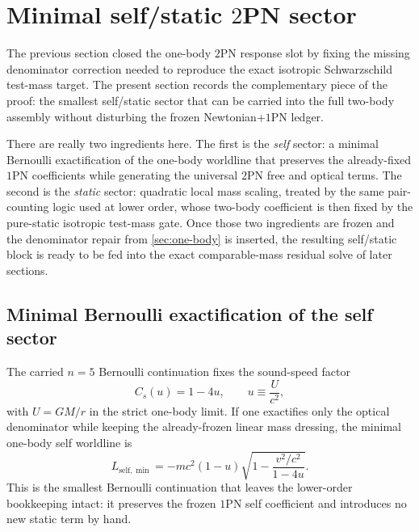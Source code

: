 \documentclass[11pt]{article}
\newcommand{\OnePN}{\mathrm{1PN}}
\newcommand{\TwoPN}{\mathrm{2PN}}
\begin{document}
\section{Minimal self/static \texorpdfstring{$2$}{2}PN sector}
\label{sec:self-static}

The previous section closed the one-body \(\TwoPN\) response slot by fixing the
missing denominator correction needed to reproduce the exact isotropic Schwarzschild
test-mass target.  The present section records the complementary piece of the proof:
the smallest self/static sector that can be carried into the full two-body assembly
without disturbing the frozen Newtonian+\(\OnePN\) ledger.

There are really two ingredients here.  The first is the \emph{self} sector: a minimal
Bernoulli exactification of the one-body worldline that preserves the already-fixed
\(\OnePN\) coefficients while generating the universal \(\TwoPN\) free and optical terms.
The second is the \emph{static} sector: quadratic local mass scaling, treated by the
same pair-counting logic used at lower order, whose two-body coefficient is then fixed
by the pure-static isotropic test-mass gate.  Once those two ingredients are frozen and
the denominator repair from \cref{sec:one-body} is inserted, the resulting
self/static block is ready to be fed into the exact comparable-mass residual solve of
later sections.

\subsection{Minimal Bernoulli exactification of the self sector}
\label{sec:self-static-self}

The carried \(n=5\) Bernoulli continuation fixes the sound-speed factor
\begin{equation}
C_s(u)=1-4u,
\qquad
u\equiv \frac{U}{c^2},
\label{eq:self-static-Cs}
\end{equation}
with \(U=GM/r\) in the strict one-body limit.  If one exactifies only the optical
denominator while keeping the already-frozen linear mass dressing, the minimal one-body
self worldline is
\begin{equation}
L_{\mathrm{self},\min}
=-m c^2(1-u)
\sqrt{1-\frac{v^2/c^2}{1-4u}}.
\label{eq:self-static-self-minimal}
\end{equation}
This is the smallest Bernoulli continuation that leaves the lower-order bookkeeping
intact: it preserves the frozen \(\OnePN\) self coefficient and introduces no new
static term by hand.
\end{document}
